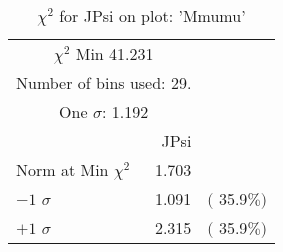  \begin{table}[h!]\centering
 {\small{
 \begin{tabular}{||l||r||r||}
 \hline
 \hline
\multicolumn{2}{||c||}{$\chi^{2}$ Min  41.231} & \\
 \multicolumn{2}{||c||}{Number of bins used:   29.} & \\
\multicolumn{2}{||c||}{One $\sigma$:    1.192} & \\
 \hline
 \hline
    & JPsi & \\
Norm at Min $\chi^{2}$  &   1.703 & \\
$-1$ $\sigma$ &   1.091  &  $($ 35.9$\%)$  \\
$+1$ $\sigma$ &   2.315  &  $($ 35.9$\%)$  \\
 \hline
 \hline
 \end{tabular}
 \caption{$\chi^{2}$ for JPsi on plot: 'Mmumu'}
 \label{tab-chijpsi}
 }}
 \end{table}
 \endinput
